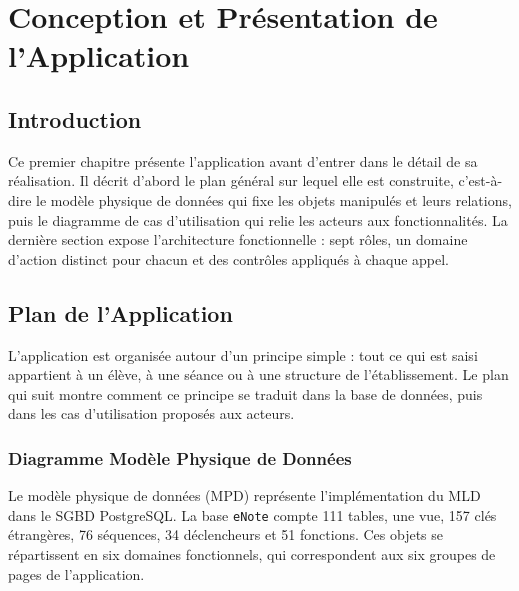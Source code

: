 \chapter{Conception et Présentation de l'Application}

\section{Introduction}
Ce premier chapitre présente l'application avant d'entrer dans le détail de sa réalisation. Il décrit
d'abord le plan général sur lequel elle est construite, c'est-à-dire le modèle physique de données qui
fixe les objets manipulés et leurs relations, puis le diagramme de cas d'utilisation qui relie les
acteurs aux fonctionnalités. La dernière section expose l'architecture fonctionnelle : sept rôles, un
domaine d'action distinct pour chacun et des contrôles appliqués à chaque appel.

\section{Plan de l'Application}
L'application est organisée autour d'un principe simple : tout ce qui est saisi appartient à un élève,
à une séance ou à une structure de l'établissement. Le plan qui suit montre comment ce principe se
traduit dans la base de données, puis dans les cas d'utilisation proposés aux acteurs.

\subsection{Diagramme Modèle Physique de Données}
Le modèle physique de données (\ac{MPD}) représente l'implémentation du \ac{MLD} dans le \ac{SGBD}
PostgreSQL. La base \texttt{eNote} compte 111 tables, une vue, 157 clés étrangères, 76 séquences,
34 déclencheurs et 51 fonctions. Ces objets se répartissent en six domaines fonctionnels, qui
correspondent aux six groupes de pages de l'application.

